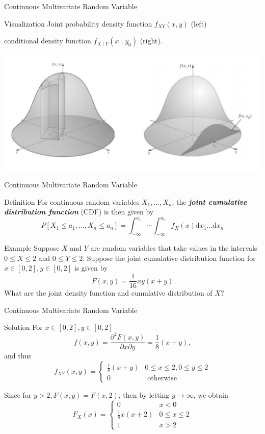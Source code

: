 \documentclass{beamer}
\newcommand{\bb}[1]{\textcolor{antiquefuchsia}{\textbf{\textit{#1}}}}
\begin{document}
\begin{frame}{Continuous Multivariate Random Variable}
\begin{block}{Visualization}
Joint probability density function $f_{X Y}(x, y)$ (left)

conditional density function $f_{X \mid Y}\left(x \mid y_{0}\right)$ (right).
\begin{center}
\includegraphics[scale=0.4]{vis.png}
\end{center}
\end{block}
\end{frame}

\begin{frame}{Continuous Multivariate Random Variable}
\begin{block}{Definition}
For continuous random variables $X_{1}, \ldots, X_{n}$, the \bb{joint cumulative distribution function} (CDF) is then given by
$$
P\left[X_{1} \leq a_{1}, \ldots, X_{n} \leq a_{n}\right]=\int_{-\infty}^{a_{1}} \cdots \int_{-\infty}^{a_{n}} f_{X}(x) \mathrm{d} x_{1} \ldots \mathrm{d} x_{n}
$$
\end{block}
\begin{block}{Example}
Suppose $X$ and $Y$ are random variables that take values in the intervals $0 \leq X \leq 2$ and $0 \leq Y \leq 2$. Suppose the joint cumulative distribution function for $x \in[0,2], y \in[0,2]$ is given by
$$
F(x, y)=\frac{1}{16} x y(x+y)
$$
What are the joint density function and cumulative distribution of $X ?$
\end{block}
\end{frame}


\begin{frame}{Continuous Multivariate Random Variable}
\begin{block}{Solution}
For $x \in[0,2], y \in[0,2]$
$$
f(x, y)=\frac{\partial^{2} F(x, y)}{\partial x \partial y}=\frac{1}{8}(x+y),
$$
and thus
$$
f_{X Y}(x, y)= \begin{cases}\frac{1}{8}(x+y) & 0 \leq x \leq 2,0 \leq y \leq 2 \\ 0 & \text { otherwise }\end{cases}
$$

Since for $y>2, F(x, y)=F(x, 2)$, then by letting $y \rightarrow \infty$, we obtain
$$
F_{X}(x)= \begin{cases}0 & x<0 \\ \frac{1}{8} x(x+2) & 0 \leq x \leq 2 \\ 1 & x>2\end{cases}
$$
\end{block}
\end{frame}
\end{document}
